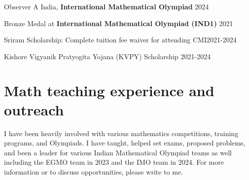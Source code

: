 \documentclass[margin,line, 10pt]{res}
\begin{document}
\begin{resume}
\vspace*{-2.5mm}

Observer A India, {\bf International Mathematical Olympiad} \hfill 2024

\vspace*{-2.5mm}
Bronze Medal at {\bf International Mathematical Olympiad (IND1)} \hfill 2021

\vspace*{-2.5mm}
Sriram Scholarship: Complete tuition fee waiver for attending CMI\hfill 2021-2024

\vspace*{-2.5mm}
Kishore Vigyanik Pratyogita Yojana (KVPY) Scholarship \hfill 2021-2024

\section{\sc Math teaching experience and outreach}
I have been heavily involved with various mathematics competitions, training programs, and Olympiads. I have taught, helped set exams, proposed problems, and been a leader for various Indian Mathematical Olympiad teams as well including the EGMO team in 2023 and the IMO team in 2024. For more information or to discuss opportunities, please write to me.



\end{resume}
\thispagestyle{lastpage}
\end{document}
